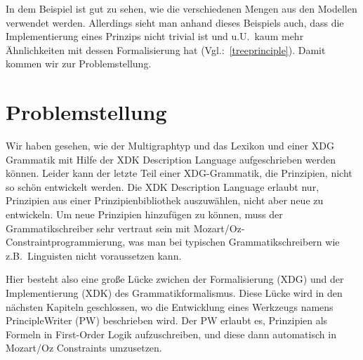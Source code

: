 In dem Beispiel ist gut zu sehen, wie die verschiedenen Mengen aus den
Modellen verwendet werden. Allerdings sieht man anhand dieses
Beispiels auch, dass die Implementierung eines Prinzips nicht trivial
ist und u.U.\ kaum mehr \"Ahnlichkeiten mit dessen Formalisierung hat
(Vgl.:~\ref{treeprinciple}). Damit kommen wir zur Problemstellung.

\section{Problemstellung}

Wir haben gesehen, wie der Multigraphtyp und das Lexikon und einer XDG
Grammatik mit Hilfe der XDK Description Language aufgeschrieben werden
k\"onnen. Leider kann der letzte Teil einer XDG-Grammatik, die
Prinzipien, nicht so sch\"on entwickelt werden.  Die XDK Description
Language erlaubt nur, Prinzipien aus einer Prinzipienbibliothek
auszuw\"ahlen, nicht aber neue zu entwickeln.  Um neue Prinzipien
hinzuf\"ugen zu k\"onnen, muss der Grammatikschreiber sehr vertraut
sein mit Mozart/Oz-Constraintprogrammierung, was man bei typischen
Grammatikschreibern wie z.B.\ Linguisten nicht voraussetzen kann.

Hier besteht also eine gro{\ss}e L\"ucke zwichen der Formalisierung
(XDG) und der Implementierung (XDK) des Grammatikformalismus. Diese
L\"ucke wird in den n\"achsten Kapiteln geschlossen, wo die
Entwicklung eines Werkzeugs namens PrincipleWriter (PW) beschrieben
wird. Der PW erlaubt es, Prinzipien als Formeln in First-Order Logik
aufzuschreiben, und diese dann automatisch in Mozart/Oz Constraints
umzusetzen.
